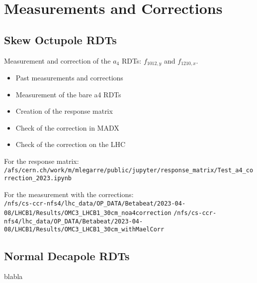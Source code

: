 \documentclass[openright,twoside,headsepline,bibliography=totoc]{scrbook}
\begin{document}
\section{Measurements and Corrections}

\subsection{Skew Octupole RDTs}

Measurement and correction of the $a_4$ RDTs: $f_{1012,y}$ and $f_{1210,x}$.

\begin{itemize}
    \item Past measurements and corrections
    \item Measurement of the bare a4 RDTs
    \item Creation of the response matrix
    \item Check of the correction in MADX
    \item Check of the correction on the LHC
\end{itemize}

For the response matrix: \\
\footnotesize
\verb|/afs/cern.ch/work/m/mlegarre/public/jupyter/response_matrix/Test_a4_correction_2023.ipynb|
\normalsize

For the measurement with the corrections: \\
\footnotesize
\verb|/nfs/cs-ccr-nfs4/lhc_data/OP_DATA/Betabeat/2023-04-08/LHCB1/Results/OMC3_LHCB1_30cm_noa4correction|
\verb|/nfs/cs-ccr-nfs4/lhc_data/OP_DATA/Betabeat/2023-04-08/LHCB1/Results/OMC3_LHCB1_30cm_withMaelCorr|
\normalsize


\subsection{Normal Decapole RDTs}

blabla



\label{End}
\end{document}
